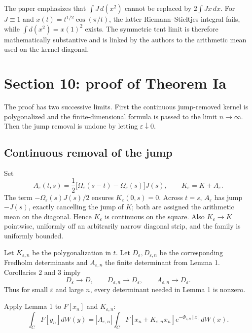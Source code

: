 \begin{remark}
The paper emphasizes that \(\int J\,d(x^2)\) cannot be replaced by \(2\int Jx\,dx\).  For \(J\equiv1\) and \(x(t)=t^{1/2}\cos(\pi/t)\), the latter Riemann--Stieltjes integral fails, while \(\int d(x^2)=x(1)^2\) exists.  The symmetric tent limit is therefore mathematically substantive and is linked by the authors to the arithmetic mean used on the kernel diagonal.
\end{remark}

\section{Section 10: proof of Theorem Ia}

The proof has two successive limits.  First the continuous jump-removed kernel is polygonalized and the finite-dimensional formula is passed to the limit \(n\to\infty\).  Then the jump removal is undone by letting \(\varepsilon\downarrow0\).

\subsection{Continuous removal of the jump}
Set
\begin{equation}
 A_\varepsilon(t,s)=\frac12\bigl[\Omega_\varepsilon(s-t)-\Omega_\varepsilon(s)\bigr]J(s),
 \qquad
 K_\varepsilon=K+A_\varepsilon.
 \tag{10.1--10.2}\label{eq:CM-Keps}
\end{equation}
The term \(-\Omega_\varepsilon(s)J(s)/2\) ensures \(K_\varepsilon(0,s)=0\).  Across \(t=s\), \(A_\varepsilon\) has jump \(-J(s)\), exactly cancelling the jump of \(K\); both are assigned the arithmetic mean on the diagonal.  Hence \(K_\varepsilon\) is continuous on the square.  Also \(K_\varepsilon\to K\) pointwise, uniformly off an arbitrarily narrow diagonal strip, and the family is uniformly bounded.

Let \(K_{\varepsilon,n}\) be the polygonalization in \(t\).  Let \(D_\varepsilon,D_{\varepsilon,n}\) be the corresponding Fredholm determinants and \(A_{\varepsilon,n}\) the finite determinant from Lemma 1.  Corollaries 2 and 3 imply
\[
 D_\varepsilon\to D,
 \qquad
 D_{\varepsilon,n}\to D_\varepsilon,
 \qquad
 A_{\varepsilon,n}\to D_\varepsilon.
\]
Thus for small \(\varepsilon\) and large \(n\), every determinant needed in Lemma 1 is nonzero.

Apply Lemma 1 to \(F[x_n]\) and \(K_{\varepsilon,n}\):
\begin{equation}
 \int_CF[y_n]dW(y)
 =|A_{\varepsilon,n}|\int_C
 F\left[x_n+K_{\varepsilon,n}x_n\right]
 e^{-\Phi_{\varepsilon,n}[x]}dW(x).
 \tag{10.8}\label{eq:CM-10.8}
\end{equation}

